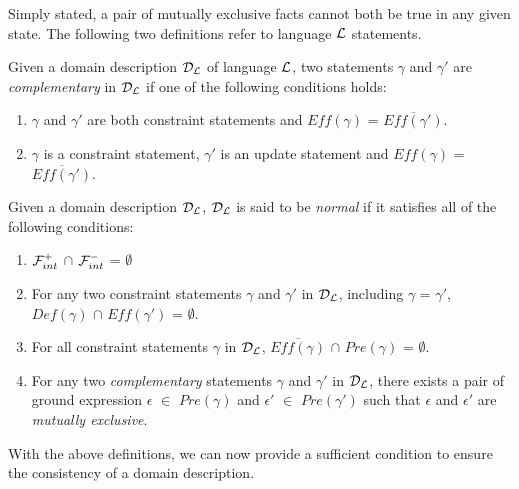 \documentclass[global,twocolumn,final]{svjour}
\newenvironment{vdefinition}
  {\begin{definition}\hspace{0.25em}}
  {\end{definition}}
\begin{document}
    Simply stated, a pair of mutually exclusive facts cannot both be true
    in any given state. The following two definitions refer to language
    ${\cal L}$ statements.

    \begin{vdefinition}
      \label{def-comp}
      Given a domain description ${\cal D_{L}}$ of language ${\cal L}$,
      two statements $\gamma$ and $\gamma'$ are {\em complementary} in
      ${\cal D_{L}}$ if one of the following conditions holds:
      \begin{enumerate}
        \item
          $\gamma$ and $\gamma'$ are both constraint statements and
          $Eff(\gamma)$ = $\overline{Eff(\gamma')}$.
        \item
          $\gamma$ is a constraint statement, $\gamma'$ is an update
          statement and $Eff(\gamma)$ = $\overline{Eff(\gamma')}$.
      \end{enumerate}
    \end{vdefinition}

    \begin{vdefinition}
      \label{def-norm}
      Given a domain description ${\cal D_{L}}$, ${\cal D_{L}}$ is said to
      be {\em normal} if it satisfies all of the following conditions:
      \begin{enumerate}
        \item
          \label{def-norm-1}
          ${\cal F}^{+}_{int}$ $\cap$ ${\cal F}^{-}_{int}$ = $\emptyset$
        \item
          \label{def-norm-2}
          For any two constraint statements $\gamma$ and $\gamma'$ in
          ${\cal D_{L}}$, including $\gamma$ = $\gamma'$, $Def(\gamma)$ $\cap$
          $Eff(\gamma')$ = $\emptyset$.
        \item
          \label{def-norm-3}
          For all constraint statements $\gamma$ in ${\cal D_{L}}$,
          $\overline{Eff(\gamma)}$ $\cap$ $Pre(\gamma)$ = $\emptyset$.
        \item
          \label{def-norm-4}
          For any two {\em complementary} statements $\gamma$ and $\gamma'$ in
          ${\cal D_{L}}$, there exists a pair of ground expression $\epsilon$
          $\in$ $Pre(\gamma)$ and $\epsilon'$ $\in$ $Pre(\gamma')$ such that
          $\epsilon$ and $\epsilon'$ are {\em mutually exclusive}.
      \end{enumerate}
    \end{vdefinition}

    With the above definitions, we can now provide a sufficient condition to
    ensure the consistency of a domain description.
\end{document}
